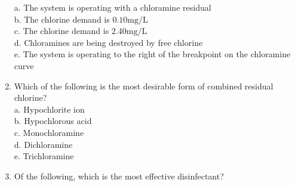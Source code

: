 \begin{enumerate}
a. The system is operating with a chloramine residual\\
b. The chlorine demand is $0.10 \mathrm{mg} / \mathrm{L}$\\
c. The chlorine demand is $2.40 \mathrm{mg} / \mathrm{L}$\\
d. Chloramines are being destroyed by free chlorine\\
e. The system is operating to the right of the breakpoint on the chloramine curve\\
 \item Which of the following is the most desirable form of combined residual chlorine?\\
a. Hypochlorite ion\\
b. Hypochlorous acid\\
c. Monochloramine\\
d. Dichloramine\\
e. Trichloramine\\

  \item Of the following, which is the most effective disinfectant?\\


\end{enumerate}
